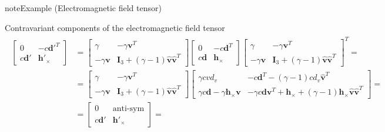 \documentclass[letterpaper,10pt,english]{jupyterBook}
\begin{document}
\begin{sphinxadmonition}{note}{Example  (Electromagnetic field tensor)}



\sphinxAtStartPar
Contravariant components of the electromagnetic field tensor
\begin{equation*}
\begin{split}\begin{aligned}
  \begin{bmatrix} 0 & - c \mathbf{d}'^T \\ c \mathbf{d}' & \mathbf{h}'_{\times} \end{bmatrix} 
  & = \begin{bmatrix} \gamma & - \gamma \mathbf{v}^T \\ -\gamma \mathbf{v} & \mathbf{I}_3 + (\gamma-1) \mathbf{\hat{v}}\mathbf{\hat{v}}^T  \end{bmatrix} \begin{bmatrix} 0 & - c \mathbf{d}^T \\ c \mathbf{d} & \mathbf{h}_{\times}\end{bmatrix} \begin{bmatrix} \gamma & - \gamma \mathbf{v}^T \\ -\gamma \mathbf{v} & \mathbf{I}_3 + (\gamma-1) \mathbf{\hat{v}}\mathbf{\hat{v}}^T \end{bmatrix}^T = \\
  & = \begin{bmatrix} \gamma & - \gamma \mathbf{v}^T \\ -\gamma \mathbf{v} & \mathbf{I}_3 + (\gamma-1) \mathbf{\hat{v}}\mathbf{\hat{v}}^T  \end{bmatrix} \begin{bmatrix} \gamma c v d_v & - c \mathbf{d}^T - (\gamma-1) c d_v \hat{\mathbf{v}}^T \\ \gamma c \mathbf{d} - \gamma \mathbf{h}_\times \mathbf{v} & -\gamma c \mathbf{d} \mathbf{v}^T + \mathbf{h}_\times + (\gamma-1) \mathbf{h}_\times \mathbf{\hat{v}} \mathbf{\hat{v}}^T \end{bmatrix} = \\
  & = \begin{bmatrix} 0 & \text{anti-sym} \\ c \mathbf{d}' & \mathbf{h}'_{\times} \end{bmatrix} = \\
\end{aligned}\end{split}
\end{equation*}
\sphinxAtStartPar

\end{sphinxadmonition}
\end{document}
